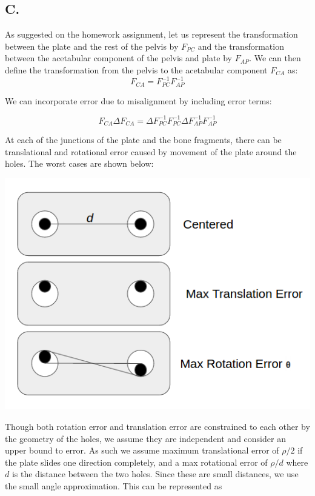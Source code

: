 \documentclass[letterpaper, 11pt]{article}
\begin{document}
\subsection*{C.}
As suggested on the homework assignment, let us represent the transformation between the plate and the rest of the pelvis by $F_{PC}$ and the transformation between the acetabular component of the pelvis and plate by $F_{AP}$. We can then define the transformation from the pelvis to the acetabular component $F_{CA}$ as:
$$F_{CA} = F_{PC}^{-1}F_{AP}^{-1}$$

We can incorporate error due to misalignment by including error terms:

$$F_{CA}\Delta F_{CA} = \Delta F_{PC}^{-1}F_{PC}^{-1}\Delta F_{AP}^{-1}F_{AP}^{-1}$$

At each of the junctions of the plate and the bone fragments, there can be translational and rotational error caused by movement of the plate around the holes. The worst cases are shown below:  \begin{center}
\includegraphics[scale=0.4]{hole_error.png}
\end{center}

Though both rotation error and translation error are constrained to each other by the geometry of the holes, we assume they are independent and consider an upper bound to error. As such we assume maximum translational error of $\rho/2$ if the plate slides one direction completely, and a max rotational error of $\rho/d$ where $d$ is the distance between the two holes. Since these are small distances, we use the small angle approximation. This can be represented as
\end{document}
